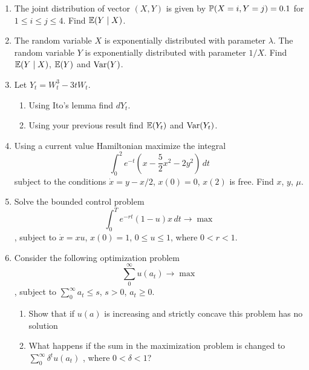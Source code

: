 \documentclass[12pt, a4paper]{article}
\begin{document}
\begin{enumerate}
\item The joint distribution of vector $(X,Y)$ is given by $\P(X=i,Y=j)=0.1$  for $1\leq i\leq j\leq 4$. Find $\E(Y\mid X)$.
\item The random variable $X$ is exponentially distributed with parameter $\lambda$. 
The random variable $Y$ is exponentially distributed with parameter $1/X$. 
Find $\E(Y \mid X)$, $\E(Y)$  and $\Var(Y)$.
\item Let $Y_t=W_t^3-3tW_t$.
\begin{enumerate}
\item Using Ito's lemma find $dY_t$.
\item Using your previous result find $\E(Y_t)$ and $\Var(Y_t)$.
\end{enumerate}

\item Using a current value Hamiltonian maximize the integral
\[
\int_0^2 e^{-t}\left(x-\frac{5}{2}x^2-2y^2\right)\, dt
\]
subject to the conditions $\dot{x}=y-x/2$, $x(0)=0$, $x(2)$ is free. Find $x$, $y$, $\mu$.
\item Solve the bounded control problem
\[
\int_0^T e^{-rt}(1-u)x\, dt \to \max
\]
, subject to $\dot{x}=xu$, $x(0)=1$, $0\leq u\leq 1$, where $0<r<1$.
\item Consider the following optimization problem
\[
\sum_0^{\infty} u(a_t) \to \max
\]
, subject to $\sum_0^{\infty}a_t \leq s$, $s>0$, $a_t \geq 0$.
\begin{enumerate}
\item Show that if $u(a)$ is increasing and strictly concave this problem has no solution
\item What happens if the sum in the maximization problem is changed to $\sum_0^{\infty} \delta^t u(a_t)$ , where $0<\delta<1$?
\end{enumerate}


\end{enumerate}
\end{document}
